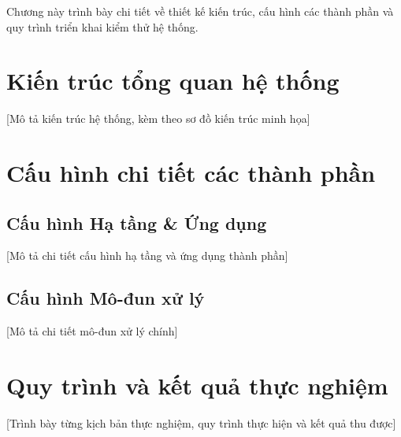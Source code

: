Chương này trình bày chi tiết về thiết kế kiến trúc, cấu hình các thành phần và quy trình triển khai kiểm thử hệ thống.

\section{Kiến trúc tổng quan hệ thống}
[Mô tả kiến trúc hệ thống, kèm theo sơ đồ kiến trúc minh họa]

\section{Cấu hình chi tiết các thành phần}
\subsection{Cấu hình Hạ tầng & Ứng dụng}
[Mô tả chi tiết cấu hình hạ tầng và ứng dụng thành phần]

\subsection{Cấu hình Mô-đun xử lý}
[Mô tả chi tiết mô-đun xử lý chính]

\section{Quy trình và kết quả thực nghiệm}
[Trình bày từng kịch bản thực nghiệm, quy trình thực hiện và kết quả thu được]

